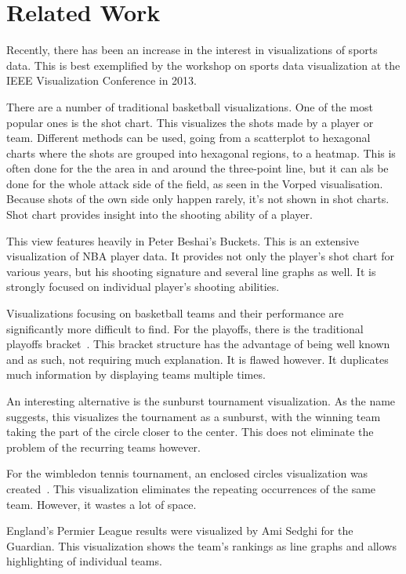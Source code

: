 \documentclass[chi_draft]{sigchi}
\begin{document}
\section{Related Work}\label{sec:literature}
Recently, there has been an increase in the interest in visualizations of sports
data. This is best exemplified by the workshop on sports data visualization at
the IEEE Visualization Conference in 2013\cite{ieeevis}. 

There are a number of traditional basketball visualizations. One of the most
popular ones is the shot chart. This visualizes the shots made by a player or team. Different methods can be used, going from a scatterplot to hexagonal charts where the shots are grouped into hexagonal regions, to a heatmap. This is often done for the the area in and around the three-point line, but it can als be done for the whole attack side of the field, as seen in the Vorped visualisation\cite{vorped}. Because shots of the own side only happen rarely, it's not shown in shot charts. Shot chart provides insight into the shooting ability of a
player\cite{goldsberry,stephenchu}.

This view features heavily in Peter Beshai's Buckets\cite{peterbeshai}. This is
an extensive visualization of NBA player data. It provides not only the player's
shot chart for various years, but his shooting signature and several line graphs
as well. It is strongly focused on individual player's shooting abilities. 

Visualizations focusing on basketball teams and their performance are
significantly more difficult to find. For the playoffs, there is the traditional
playoffs bracket~\cite{tournamentladder}. This bracket structure has the
advantage of being well known and as such, not requiring much explanation. It is
flawed however. It duplicates much information by displaying teams multiple
times. 

An interesting alternative is the sunburst tournament
visualization\cite{sunburst}. As the name suggests, this visualizes the
tournament as a sunburst, with the winning team taking the part of the circle
closer to the center. This does not eliminate the problem of the recurring teams
however.

For the wimbledon tennis tournament, an enclosed circles visualization was
created~\cite{enclosedcircles}. This visualization eliminates the repeating
occurrences of the same team. However, it wastes a lot of space. 

England's Permier League results were visualized by Ami Sedghi for the
Guardian\cite{premierleague}. This visualization shows the team's rankings as
line graphs and allows highlighting of individual teams.
\end{document}
